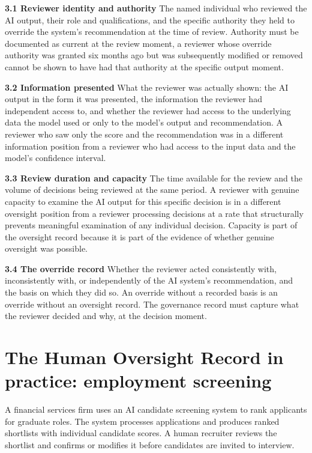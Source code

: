 \textbf{3.1 Reviewer identity and authority} The named individual who reviewed the AI output, their role and qualifications, and the specific authority they held to override the system's recommendation at the time of review. Authority must be documented as current at the review moment, a reviewer whose override authority was granted six months ago but was subsequently modified or removed cannot be shown to have had that authority at the specific output moment.

\textbf{3.2 Information presented} What the reviewer was actually shown: the AI output in the form it was presented, the information the reviewer had independent access to, and whether the reviewer had access to the underlying data the model used or only to the model's output and recommendation. A reviewer who saw only the score and the recommendation was in a different information position from a reviewer who had access to the input data and the model's confidence interval.

\textbf{3.3 Review duration and capacity} The time available for the review and the volume of decisions being reviewed at the same period. A reviewer with genuine capacity to examine the AI output for this specific decision is in a different oversight position from a reviewer processing decisions at a rate that structurally prevents meaningful examination of any individual decision. Capacity is part of the oversight record because it is part of the evidence of whether genuine oversight was possible.

\textbf{3.4 The override record} Whether the reviewer acted consistently with, inconsistently with, or independently of the AI system's recommendation, and the basis on which they did so. An override without a recorded basis is an override without an oversight record. The governance record must capture what the reviewer decided and why, at the decision moment.

\section{The Human Oversight Record in practice: employment screening}

A financial services firm uses an AI candidate screening system to rank applicants for graduate roles. The system processes applications and produces ranked shortlists with individual candidate scores. A human recruiter reviews the shortlist and confirms or modifies it before candidates are invited to interview.

